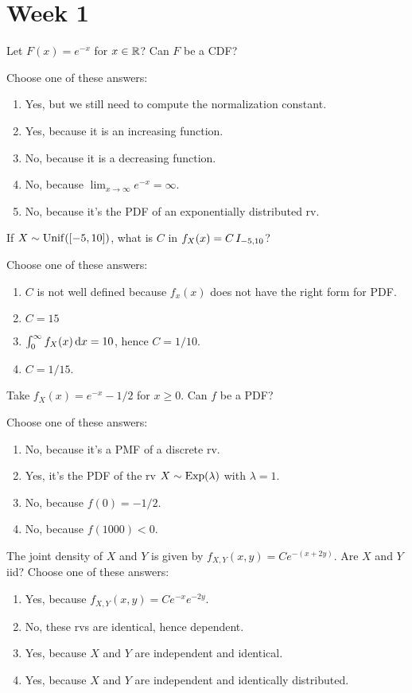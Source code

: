 \documentclass[poll_tutorial_format]{subfiles}
\begin{document}
\section{Week 1}

\begin{exercise}
Let $F(x) = e^{-x}$ for $x\in \mathbb{R}$? Can $F$ be a CDF?

Choose one of these answers:
\begin{enumerate}
\item Yes, but we still need to compute the normalization constant.
\item Yes, because it is an increasing function.
\item No, because it is a decreasing function.
\item No, because $\lim_{x\to\infty} e^{-x}=\infty$.
\item No, because it's the PDF of an exponentially distributed rv.
\end{enumerate}
\end{exercise}


\begin{exercise}
If $X\sim  \mathrm{Unif}([-5, 10])$, what is $C$ in $f_{X}(x) = C \,I_{-5, 10}$?

Choose one of these answers:
\begin{enumerate}
\item $C$ is not well defined because $f_{x}(x)$ does not have the right form for PDF.
\item $C=15$
\item $\int_0^{\infty} f_{X}(x) \,\textrm{d}x = 10$, hence $C=1/10$.
\item $C=1/15$.
\end{enumerate}
\end{exercise}

\begin{exercise}
Take $f_X(x) = e^{-x}-1/2$ for $x\geq 0$.  Can $f$ be a PDF?

Choose one of these answers:
\begin{enumerate}
\item No, because it's a PMF of a discrete rv.
\item Yes, it's the PDF of the rv $X\sim\mathrm{Exp}(\lambda)$ with $\lambda = 1$.
\item No, because $f(0)  = -1/2$.
\item No, because $f(1000) < 0$.
\end{enumerate}
\end{exercise}

\begin{exercise}
The joint density of $X$ and $Y$ is given by $f_{X,Y}(x,y) = Ce^{-(x + 2y)}$.
Are $X$ and $Y$ iid?
Choose one of these answers:
\begin{enumerate}
\item Yes, because $f_{X,Y}(x, y) = C e^{-x}e^{-2y}$.
\item No,  these rvs are identical, hence dependent.
\item Yes, because $X$ and $Y$ are independent and identical.
\item Yes, because $X$ and $Y$ are independent and identically distributed.
\end{enumerate}
\end{exercise}
\end{document}
